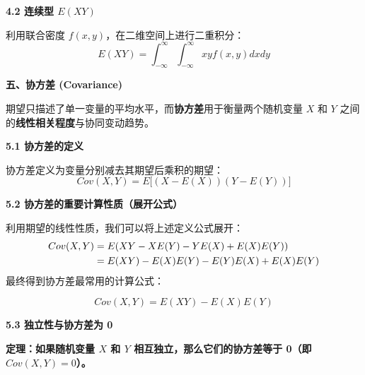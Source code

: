 \documentclass[10pt]{article}
\numberwithin{equation}{section}
\theoremstyle{plain}
\theoremstyle{definition}
\theoremstyle{remark}
\begin{document}
{\par\vspace{0.8ex}\noindent\normalsize\bfseries\color{accentD} 4.2 连续型 $E(XY)$\par}
利用联合密度 $f(x, y)$，在二维空间上进行二重积分：
\[ \displaystyle E(XY) = \int_{-\infty}^{\infty} \int_{-\infty}^{\infty} xy f(x, y) dx dy \]

{\par\vspace{1ex}\noindent\large\bfseries\color{brandD} 五、协方差 (Covariance)\par}\par\vspace{0.5ex}
期望只描述了单一变量的平均水平，而\textbf{协方差}用于衡量两个随机变量 $X$ 和 $Y$ 之间的\textbf{线性相关程度}与协同变动趋势。

{\par\vspace{0.8ex}\noindent\normalsize\bfseries\color{secblue} 5.1 协方差的定义\par}
协方差定义为变量分别减去其期望后乘积的期望：
\[ \displaystyle Cov(X, Y) = E\big[(X - E(X))(Y - E(Y))\big] \]

{\par\vspace{0.8ex}\noindent\normalsize\bfseries\color{accentD} 5.2 协方差的重要计算性质（展开公式）\par}
利用期望的线性性质，我们可以将上述定义公式展开：
\[
\begin{aligned}
\displaystyle Cov(X, Y) &= E(XY - X E(Y) - Y E(X) + E(X)E(Y)) \\
\displaystyle &= E(XY) - E(X)E(Y) - E(Y)E(X) + E(X)E(Y)
\end{aligned}
\]
最终得到协方差最常用的计算公式：
\begin{SummaryBox}[协方差的计算公式]
\[ \displaystyle Cov(X, Y) = E(XY) - E(X)E(Y) \]
\end{SummaryBox}

{\par\vspace{0.8ex}\noindent\normalsize\bfseries\color{secblue} 5.3 独立性与协方差为 0\par}
\textbf{定理：如果随机变量 $X$ 和 $Y$ 相互独立，那么它们的协方差等于 0（即 $Cov(X, Y) = 0$）。}
\end{document}
